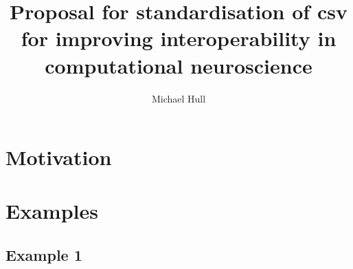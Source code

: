 \documentclass{article}
\title{Proposal for standardisation of csv for improving interoperability in computational neuroscience}
\author{Michael Hull}
\begin{document}
\maketitle

\tableofcontents

\section{Motivation}

\section{Examples}
\subsection{Example 1}

\end{document}
